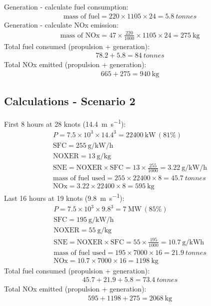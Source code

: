 Generation - calculate fuel consumption:
\begin{gather}
    \textrm{mass of fuel} = 220 \times 1105 \times 24 = \SI{5.8}{tonnes}
\end{gather}
Generation - calculate NOx emission:
\begin{gather}
    \textrm{mass of NOx} = 47 \times \frac{220}{1000} \times 1105 \times 24 = \SI{275}{\kilo\gram}
\end{gather}
Total fuel consumed (propulsion + generation):
\begin{gather}
    78.2+5.8=\SI{84}{tonnes}
\end{gather}
Total NOx emitted (propulsion + generation):
\begin{gather}
    665 + 275 =\SI{940}{\kilo\gram}
\end{gather}
\subsection{Calculations - Scenario 2}
First 8 hours at 28 knots (\SI{14.4}{\meter\per\second}):
\begin{gather}
    P = 7.5\times 10^3 \times 14.4^3 = \SI{22400}{\kilo\watt} \, (81\%)\\
    \textrm{SFC} = \SI{255}{\gram\per\kilo\watt\per\hour}\\
    \textrm{NOXER} = \SI{13}{\gram\per\kilo\gram}\\
    \textrm{SNE} = \textrm{NOXER}\times \textrm{SFC} = 13\times \frac{255}{1000} = \SI{3.22}{\gram\per\kilo\watt\per\hour}\\
    \textrm{mass of fuel used} = 255\times 22400 \times 8 = \SI{45.7}{tonnes}\\
    \textrm{NOx} = 3.22\times 22400\times 8 = \SI{595}{\kilo\gram}
\end{gather}
Last 16 hours at 19 knots (\SI{9.8}{\meter\per\second}):
\begin{gather}
    P = 7.5\times 10^3 \times 9.8^3 = \SI{7}{\mega\watt}\, (85\%)\\
    \textrm{SFC} = \SI{195}{\gram\per\kilo\watt\per\hour}\\
    \textrm{NOXER} = \SI{55}{\gram\per\kilo\gram}\\
    \textrm{SNE} = \textrm{NOXER} \times \textrm{SFC} = 55\times \frac{195}{1000} = \SI{10.7}{\gram\per\kilo\watt\hour}\\
    \textrm{mass of fuel used} = 195 \times 7000\times 16 = \SI{21.9}{tonnes}\\
    \textrm{NOx} = 10.7 \times 7000 \times 16 = \SI{1198}{\kilo\gram}
\end{gather}
Total fuel consumed (propulsion + generation):
\begin{gather}
    45.7 + 21.9 + 5.8 = \SI{73.4}{tonnes}
\end{gather}
Total NOx emitted (propulsion + generation):
\begin{gather}
    595 + 1198 + 275 = \SI{2068}{\kilo\gram}
\end{gather}
